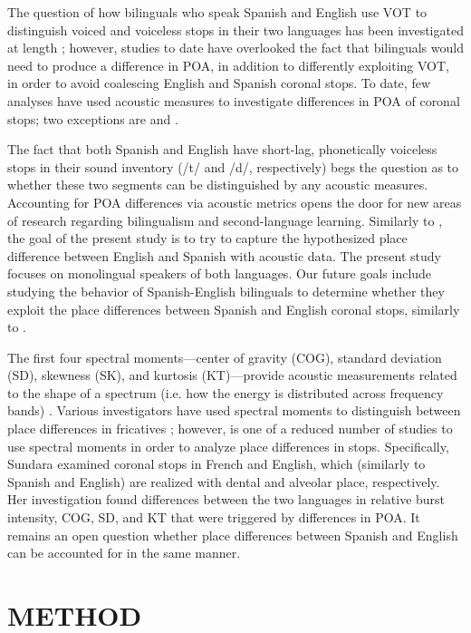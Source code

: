 \documentclass[a4paper,11pt,twocolumn]{article}
\begin{document}
The question of how bilinguals who speak Spanish and English use VOT to distinguish voiced and voiceless stops in their two languages has been investigated at length \cite{williamsPerception1977, williamsModification1979}; however, studies to date have overlooked the fact that bilinguals would need to produce a difference in POA, in addition to differently exploiting VOT, in order to avoid coalescing English and Spanish coronal stops. To date, few analyses have used acoustic measures to investigate differences in POA of coronal stops; two exceptions are \cite{sundara2005acoustic} and \cite{sundara2006bilingualism}.

The fact that both Spanish and English have short-lag, phonetically voiceless stops in their sound inventory (/t/ and /d/, respectively) begs the question as to whether these two segments can be distinguished by any acoustic measures.  Accounting for POA differences via acoustic metrics opens the door for new areas of research regarding bilingualism and second-language learning. Similarly to \cite{sundara2005acoustic}, the goal of the present study is to try to capture the hypothesized place difference between English and Spanish with acoustic data. The present study focuses on monolingual speakers of both languages. Our future goals include studying the behavior of Spanish-English bilinguals to determine whether they exploit the place differences between Spanish and English coronal stops, similarly to \cite{sundara2006bilingualism}.

The first four spectral moments---center of gravity (COG), standard deviation (SD), skewness (SK), and kurtosis (KT)---provide acoustic measurements related to the shape of a spectrum (i.e. how the energy is distributed across frequency bands) \cite{jones2013bloomsbury}. Various investigators have used spectral moments to distinguish between place differences in fricatives \cite{gordon2002cross,jongman2000acoustic}; however, \cite{sundara2005acoustic} is one of a reduced number of studies to use spectral moments in order to analyze place differences in stops. Specifically, Sundara examined coronal stops in French and English, which (similarly to Spanish and English) are realized with dental and alveolar place, respectively. Her investigation found differences between the two languages in relative burst intensity, COG, SD, and KT that were triggered by differences in POA. It remains an open question whether place differences between Spanish and English can be accounted for in the same manner.

\section{METHOD}
\end{document}
